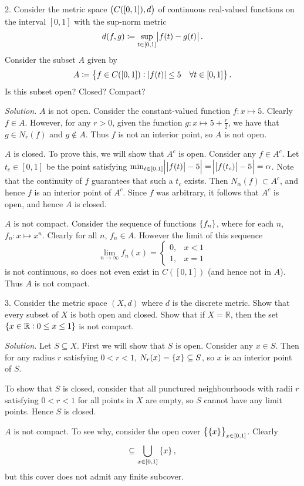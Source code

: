 \documentclass{article}
\newcommand{\R}{\mathbb{R}}
\begin{document}
\newpage

2. Consider the metric space $\del{C([0, 1]), d}$ of continuous real-valued
   functions on the interval $[0, 1]$ with the sup-norm metric
%
\begin{equation*}
    d(f, g) \coloneqq \sup_{t \in [0, 1]} \envert{f(t) - g(t)}
    .
\end{equation*}
%
Consider the subset $A$ given by
%
\begin{equation*}
    A \coloneqq \cbr{f \in C([0, 1]): |f(t)| \leq 5 \quad \forall t \in [0, 1]}
    .
\end{equation*}
%
Is this subset open? Closed? Compact?

\textit{Solution.}
$A$ is not open. Consider the constant-valued function $f: x \mapsto 5$.
Clearly $f \in A$. However, for any $r > 0$, given the function $g: x
\mapsto 5 + \frac{r}{2}$, we have that $g \in N_r(f)$ and $g \not\in A$.
Thus $f$ is not an interior point, so $A$ is not open.

$A$ is closed. To prove this, we will show that $A^c$ is open. Consider
any $f \in A^c$. Let $t_c \in [0, 1]$ be the point satisfying $\min_{t
\in [0, 1]} \envert{\,\envert{f(t)} - 5} = \envert{\,\envert{f(t_c)} -
5} = \alpha$. Note that the continuity of $f$ guarantees that such a
$t_c$ exists. Then $N_\alpha (f) \subset A^c$, and hence $f$ is an
interior point of $A^c$. Since $f$ was arbitrary, it follows that $A^c$
is open, and hence $A$ is closed.

$A$ is not compact. Consider the sequence of functions $\cbr{f_n}$,
where for each $n$, $f_n: x \mapsto x^n$. Clearly for all $n$, $f_n \in
A$. However the limit of this sequence
%
\begin{equation*}
    \lim_{n \to \infty} f_n(x) = \begin{cases}
        0, & x < 1 \\
        1, & x = 1
    \end{cases}
\end{equation*}
%
is not continuous, so does not even exist in $C([0, 1])$ (and hence not
in $A$). Thus $A$ is not compact.

\newpage

3. Consider the metric space $(X, d)$ where $d$ is the discrete metric.
   Show that every subset of $X$ is both open and closed. Show that if
   $X = \R$, then the set $\cbr{x \in \R: 0 \leq x \leq 1}$ is not
   compact.

\textit{Solution.}
Let $S \subseteq X$. First we will show that $S$ is open. Consider any
$x \in S$. Then for any radius $r$ satisfying $0 < r < 1$, $N_r(x) =
\cbr{x} \subseteq S$, so $x$ is an interior point of $S$.

To show that $S$ is closed, consider that all punctured neighbourhoods
with radii $r$ satisfying $0 < r < 1$ for all points in $X$ are empty,
so $S$ cannot have any limit points. Hence $S$ is closed.

$A$ is not compact. To see why, consider the open cover
$\cbr{\cbr{x}}_{x \in [0, 1]}$. Clearly
%
\begin{equation*}
    [0, 1] \subseteq \bigcup_{x \in [0, 1]} \cbr{x}
    ,
\end{equation*}
%
but this cover does not admit any finite subcover.
\end{document}
